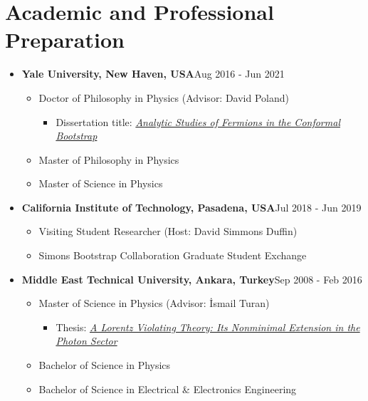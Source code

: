 \documentclass[a4paper,11pt]{article}
\begin{document}
\section{\textcolor{burntorange}{Academic and Professional Preparation}}
\begin{itemize}[noitemsep,nolistsep] 
	\item[] \textbf{Yale University, New Haven, USA}\hfill Aug 2016 - Jun 2021
	\vspace*{-.5em}
	\begin{itemize}
		\item[] Doctor of Philosophy in Physics \hfill (Advisor: David Poland)\hspace*{2.2em}\vspace*{-.5em}
		\begin{itemize}
			\item[] Dissertation title: \hyperref{https://www.proquest.com/docview/2557212384/4B6B347681464779PQ/1}{}{}{\emph{Analytic Studies of Fermions in the Conformal Bootstrap}}\vspace*{-.5em}
		\end{itemize}
		\item[] Master of Philosophy in Physics\vspace*{-.5em}
		\item[]Master of Science in Physics
	\end{itemize} 
	\item[] \textbf{California Institute of Technology, Pasadena, USA}\hfill Jul 2018 - Jun 2019
	\vspace*{-.5em}
\begin{itemize}
	\item[] Visiting Student Researcher \hfill (Host: David Simmons Duffin)\hspace*{2.2em}\vspace*{-.5em}
	\item[] Simons Bootstrap Collaboration Graduate Student Exchange
\end{itemize} 
	\item[] \textbf{Middle East Technical University, Ankara, Turkey}\hfill Sep 2008 - Feb 2016
\vspace*{-.5em}
\begin{itemize}
	\item[] Master of Science in Physics \hfill (Advisor: İsmail Turan)\hspace*{2.2em}\vspace*{-.5em}
	\begin{itemize}
		\item[] Thesis: \hyperref{https://hdl.handle.net/11511/25431 }{}{}{\emph{A Lorentz Violating Theory: Its Nonminimal Extension in the Photon Sector}}\vspace*{-.5em}
	\end{itemize}
	\item[] Bachelor of Science in Physics\vspace*{-.5em}
	\item[] Bachelor of Science in Electrical \& Electronics Engineering
\end{itemize} 
\end{itemize}
\end{document}
